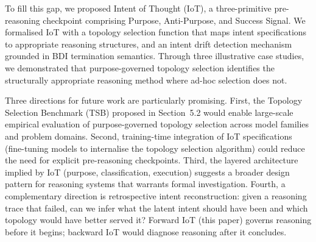 \documentclass[11pt,a4paper]{article}
\begin{document}
To fill this gap, we proposed Intent of Thought (IoT), a three-primitive pre-reasoning checkpoint comprising Purpose, Anti-Purpose, and Success Signal. We formalised IoT with a topology selection function that maps intent specifications to appropriate reasoning structures, and an intent drift detection mechanism grounded in BDI termination semantics. Through three illustrative case studies, we demonstrated that purpose-governed topology selection identifies the structurally appropriate reasoning method where ad-hoc selection does not.

Three directions for future work are particularly promising. First, the Topology Selection Benchmark (TSB) proposed in Section~5.2 would enable large-scale empirical evaluation of purpose-governed topology selection across model families and problem domains. Second, training-time integration of IoT specifications (fine-tuning models to internalise the topology selection algorithm) could reduce the need for explicit pre-reasoning checkpoints. Third, the layered architecture implied by IoT (purpose, classification, execution) suggests a broader design pattern for reasoning systems that warrants formal investigation. Fourth, a complementary direction is retrospective intent reconstruction: given a reasoning trace that failed, can we infer what the latent intent should have been and which topology would have better served it? Forward IoT (this paper) governs reasoning before it begins; backward IoT would diagnose reasoning after it concludes.



\end{document}
